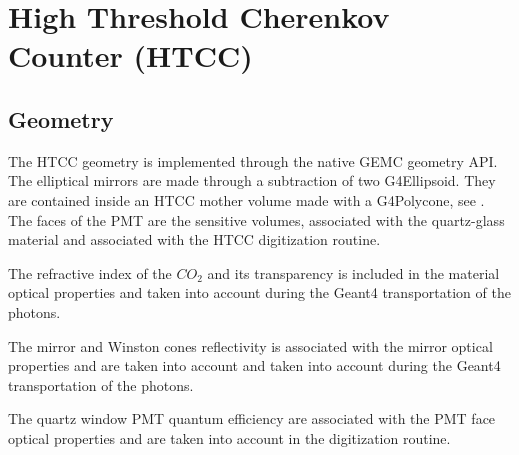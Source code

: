 \section{High Threshold Cherenkov Counter (HTCC)}

\subsection{Geometry}

The HTCC geometry is implemented through the native GEMC geometry API. The elliptical mirrors are made through a subtraction of
two G4Ellipsoid. They are contained inside an HTCC mother volume made with a G4Polycone, see .
The faces of the PMT are the sensitive volumes, associated with the quartz-glass material and associated with the HTCC digitization routine.

The refractive index of the $CO_2$ and its transparency is included in the material optical properties and taken
into account during the Geant4 transportation of the photons.

The mirror and Winston cones reflectivity is associated with the mirror optical properties and are taken into
account and taken into account during the Geant4 transportation of the photons.

The quartz window PMT quantum efficiency are associated with the PMT face optical properties and are taken into account in
the digitization routine.


